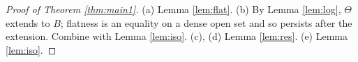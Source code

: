 \begin{proof}[Proof of Theorem \ref{thm:main1}]
(a) Lemma \ref{lem:flat}. (b) By Lemma \ref{lem:log}, $\Theta$ extends to $B$; flatness is an equality on a dense open set and so persists after the extension. Combine with Lemma \ref{lem:iso}. (c), (d) Lemma \ref{lem:res}. (e) Lemma \ref{lem:iso}.
\end{proof}
